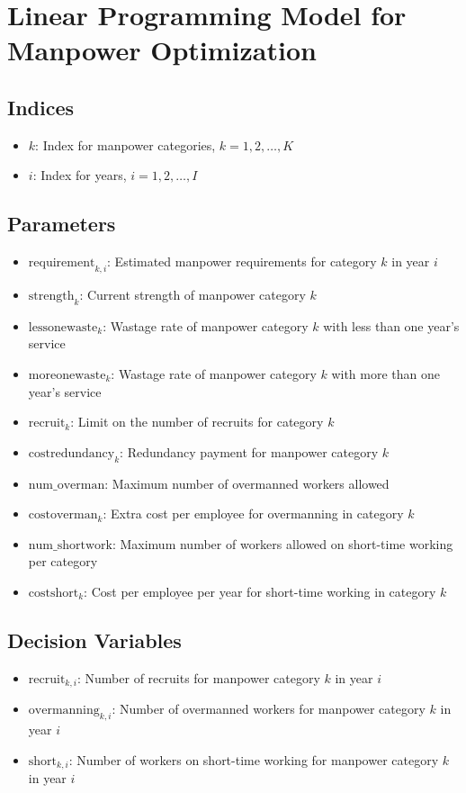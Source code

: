 \documentclass{article}
\begin{document}
\section*{Linear Programming Model for Manpower Optimization}

\subsection*{Indices}
\begin{itemize}
    \item \( k \): Index for manpower categories, \( k = 1, 2, \ldots, K \)
    \item \( i \): Index for years, \( i = 1, 2, \ldots, I \)
\end{itemize}

\subsection*{Parameters}
\begin{itemize}
    \item \( \text{requirement}_{k, i} \): Estimated manpower requirements for category \( k \) in year \( i \)
    \item \( \text{strength}_{k} \): Current strength of manpower category \( k \)
    \item \( \text{lessonewaste}_{k} \): Wastage rate of manpower category \( k \) with less than one year's service
    \item \( \text{moreonewaste}_{k} \): Wastage rate of manpower category \( k \) with more than one year's service
    \item \( \text{recruit}_{k} \): Limit on the number of recruits for category \( k \)
    \item \( \text{costredundancy}_{k} \): Redundancy payment for manpower category \( k \)
    \item \( \text{num\_overman} \): Maximum number of overmanned workers allowed
    \item \( \text{costoverman}_{k} \): Extra cost per employee for overmanning in category \( k \)
    \item \( \text{num\_shortwork} \): Maximum number of workers allowed on short-time working per category
    \item \( \text{costshort}_{k} \): Cost per employee per year for short-time working in category \( k \)
\end{itemize}

\subsection*{Decision Variables}
\begin{itemize}
    \item \( \text{recruit}_{k, i} \): Number of recruits for manpower category \( k \) in year \( i \)
    \item \( \text{overmanning}_{k, i} \): Number of overmanned workers for manpower category \( k \) in year \( i \)
    \item \( \text{short}_{k, i} \): Number of workers on short-time working for manpower category \( k \) in year \( i \)
\end{itemize}
\end{document}

